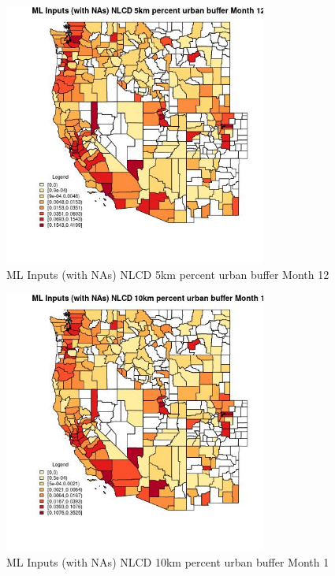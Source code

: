 \begin{figure} 
\centering  
\includegraphics[width=0.77\textwidth]{Code_Outputs/Report_ML_input_PM25_Step4_part_f_de_duplicated_aves_prioritize_24hr_obswNAs_CountyNLCD_5km_percent_urban_buffermedianMonth12.jpg} 
\caption{\label{fig:Report_ML_input_PM25_Step4_part_f_de_duplicated_aves_prioritize_24hr_obswNAsCountyNLCD_5km_percent_urban_buffermedianMonth12}ML Inputs (with NAs) NLCD 5km percent urban buffer Month 12} 
\end{figure} 
 

\begin{figure} 
\centering  
\includegraphics[width=0.77\textwidth]{Code_Outputs/Report_ML_input_PM25_Step4_part_f_de_duplicated_aves_prioritize_24hr_obswNAs_CountyNLCD_10km_percent_urban_buffermedianMonth1.jpg} 
\caption{\label{fig:Report_ML_input_PM25_Step4_part_f_de_duplicated_aves_prioritize_24hr_obswNAsCountyNLCD_10km_percent_urban_buffermedianMonth1}ML Inputs (with NAs) NLCD 10km percent urban buffer Month 1} 
\end{figure} 
 

